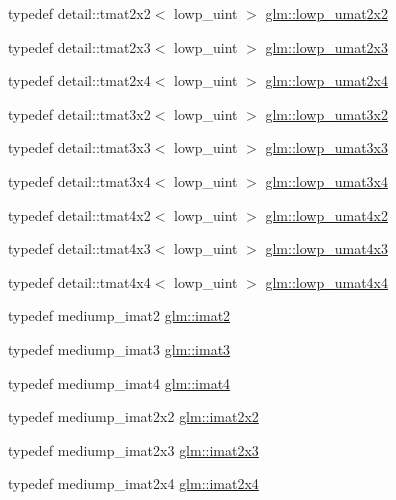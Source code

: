 \begin{DoxyCompactItemize}
typedef detail\+::tmat2x2$<$ lowp\+\_\+uint $>$ \hyperlink{group__gtc__matrix__integer_ga2159eb0e37b35ff0ea9a2c909bafaa72}{glm\+::lowp\+\_\+umat2x2}
\item 
typedef detail\+::tmat2x3$<$ lowp\+\_\+uint $>$ \hyperlink{group__gtc__matrix__integer_gacce75aac1f0f0ae3cc18f4cde5db8def}{glm\+::lowp\+\_\+umat2x3}
\item 
typedef detail\+::tmat2x4$<$ lowp\+\_\+uint $>$ \hyperlink{group__gtc__matrix__integer_gaf468ff72b7f833789887c61b8db33869}{glm\+::lowp\+\_\+umat2x4}
\item 
typedef detail\+::tmat3x2$<$ lowp\+\_\+uint $>$ \hyperlink{group__gtc__matrix__integer_gab06e14a13476419d7e8c2421fc7f60a1}{glm\+::lowp\+\_\+umat3x2}
\item 
typedef detail\+::tmat3x3$<$ lowp\+\_\+uint $>$ \hyperlink{group__gtc__matrix__integer_ga228d53c61d9ebac283e8f76754c6cff1}{glm\+::lowp\+\_\+umat3x3}
\item 
typedef detail\+::tmat3x4$<$ lowp\+\_\+uint $>$ \hyperlink{group__gtc__matrix__integer_gace8e281261bb90e62c67444ec0c9e7e7}{glm\+::lowp\+\_\+umat3x4}
\item 
typedef detail\+::tmat4x2$<$ lowp\+\_\+uint $>$ \hyperlink{group__gtc__matrix__integer_gacc7fd3996cf8cb661099c95a0363d051}{glm\+::lowp\+\_\+umat4x2}
\item 
typedef detail\+::tmat4x3$<$ lowp\+\_\+uint $>$ \hyperlink{group__gtc__matrix__integer_ga37c5f105dd98823c07c39710f57260fe}{glm\+::lowp\+\_\+umat4x3}
\item 
typedef detail\+::tmat4x4$<$ lowp\+\_\+uint $>$ \hyperlink{group__gtc__matrix__integer_ga38b31bccefd74f6a9e9272cac084df34}{glm\+::lowp\+\_\+umat4x4}
\item 
typedef mediump\+\_\+imat2 \hyperlink{group__gtc__matrix__integer_ga77a581b3366fb63fc72f8f20830003e0}{glm\+::imat2}
\item 
typedef mediump\+\_\+imat3 \hyperlink{group__gtc__matrix__integer_ga45481922dd07a3a8e23758286311ee97}{glm\+::imat3}
\item 
typedef mediump\+\_\+imat4 \hyperlink{group__gtc__matrix__integer_ga40fc5c5e0b07543497aa1c314891544a}{glm\+::imat4}
\item 
typedef mediump\+\_\+imat2x2 \hyperlink{group__gtc__matrix__integer_gaf7f44f44d966377666d41ed059524732}{glm\+::imat2x2}
\item 
typedef mediump\+\_\+imat2x3 \hyperlink{group__gtc__matrix__integer_ga143bc5177bac9991d84b70da03952516}{glm\+::imat2x3}
\item 
typedef mediump\+\_\+imat2x4 \hyperlink{group__gtc__matrix__integer_gafe2d058e164fd1badace451ffcf4ae46}{glm\+::imat2x4}

\end{DoxyCompactItemize}
